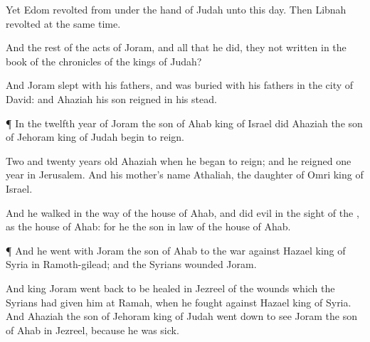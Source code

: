 {Yet
Edom
revolted from under the
hand of
Judah unto this
day. Then
Libnah
revolted at the
same
time.

And the
rest of the
acts of
Joram, and all that he
did,
{} they not
written in the
book of the
chronicles of the
kings of
Judah?

And
Joram
slept with his
fathers, and was
buried with his
fathers in the
city of
David: and
Ahaziah his
son
reigned in his stead.


\par }{\PP {}¶ In the
twelfth
year of
Joram the
son of
Ahab
king of
Israel did
Ahaziah the
son of
Jehoram
king of
Judah begin to
reign.

Two and
twenty
years
old
{}
Ahaziah when he began to
reign; and he
reigned
one
year in
Jerusalem. And his
mother’s
name
{}
Athaliah, the
daughter of
Omri
king of
Israel.

And he
walked in the
way of the
house of
Ahab, and
did
evil in the
sight of the
{}, as
{} the
house of
Ahab: for he
{} the son in
law of the
house of
Ahab.


\par }{\PP {}¶ And he
went with
Joram the
son of
Ahab to the
war against
Hazael
king of
Syria in
Ramoth-gilead; and the
Syrians
wounded
Joram.

And
king
Joram went
back to be
healed in
Jezreel of the
wounds which the
Syrians had
given him at
Ramah, when he
fought against
Hazael
king of
Syria. And
Ahaziah the
son of
Jehoram
king of
Judah went
down to
see
Joram the
son of
Ahab in
Jezreel, because he was
sick.




\par }
